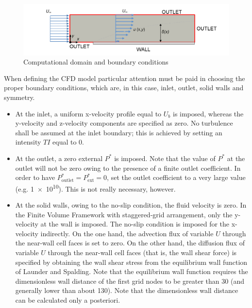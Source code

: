 \documentclass[12pt]{article}
\begin{document}
                \begin{figure}[ht!]
                        \centering
                        \includegraphics[width=\textwidth]{Domain.png}
                        \caption{Computational domain and boundary conditions}
                        \label{fig:domain}
                \end{figure}

                When defining the CFD model particular attention must be paid in choosing the proper boundary conditions, which are, in this case, inlet, outlet, solid walls and symmetry.

                \begin{itemize}
                        \item At the inlet, a uniform x-velocity profile equal to \( U_b \) is imposed, whereas the y-velocity and z-velocity components are specified as zero. No turbulence shall be assumed at the inlet boundary; this is achieved by setting an intensity \( TI \) equal to 0.
                        \item At the outlet, a zero external \( P^* \) is imposed. Note that the value of \( P^* \) at the outlet will not be zero owing to the presence of a finite outlet coefficient. In order to have \(P_{\text{outlet}}^* = P_{\text{ext}}^* = 0\), set the outlet coefficient to a very large value (e.g. \num{1e+10}). This is not really necessary, however.
                        \item At the solid walls, owing to the no-slip condition, the fluid velocity is zero. In the Finite Volume Framework with staggered-grid arrangement, only the y-velocity at the wall is imposed. The no-slip condition is imposed for the x-velocity indirectly. On the one hand, the advection flux of variable \( U \) through the near-wall cell faces is set to zero. On the other hand, the diffusion flux of variable \( U \) through the near-wall cell faces (that is, the wall shear force) is specified by obtaining the wall shear stress from the equilibrium wall function of Launder and Spalding. Note that the equilibrium wall function requires the dimensionless wall distance of the first grid nodes to be greater than 30 (and generally lower than about 130). Note that the dimensionless wall distance can be calculated only a posteriori.
                \end{itemize}
        
\end{document}
